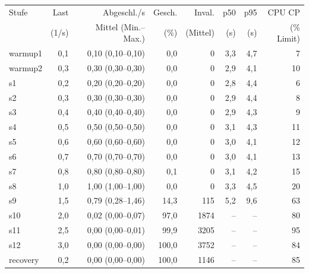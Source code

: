 \begin{tabular}{lrrrrrrr}
\toprule
Stufe & Last & Abgeschl./s & Gesch. & Inval. & p50 & p95 & CPU CP \\
 & (1/s) & Mittel (Min.–Max.) & (\%) & (Mittel) & (s) & (s) & (\% Limit) \\
\midrule
warmup1 & 0,1 & 0,10 (0,10–0,10) & 0,0 & 0 & 3,3 & 4,7 & 7 \\
warmup2 & 0,3 & 0,30 (0,30–0,30) & 0,0 & 0 & 2,9 & 4,1 & 10 \\
s1 & 0,2 & 0,20 (0,20–0,20) & 0,0 & 0 & 2,8 & 4,4 & 6 \\
s2 & 0,3 & 0,30 (0,30–0,30) & 0,0 & 0 & 2,9 & 4,4 & 8 \\
s3 & 0,4 & 0,40 (0,40–0,40) & 0,0 & 0 & 2,9 & 4,3 & 9 \\
s4 & 0,5 & 0,50 (0,50–0,50) & 0,0 & 0 & 3,1 & 4,3 & 11 \\
s5 & 0,6 & 0,60 (0,60–0,60) & 0,0 & 0 & 3,0 & 4,1 & 12 \\
s6 & 0,7 & 0,70 (0,70–0,70) & 0,0 & 0 & 3,0 & 4,1 & 13 \\
s7 & 0,8 & 0,80 (0,80–0,80) & 0,1 & 0 & 3,1 & 4,2 & 15 \\
s8 & 1,0 & 1,00 (1,00–1,00) & 0,0 & 0 & 3,3 & 4,5 & 20 \\
s9 & 1,5 & 0,79 (0,28–1,46) & 14,3 & 115 & 5,2 & 9,6 & 63 \\
s10 & 2,0 & 0,02 (0,00–0,07) & 97,0 & 1874 & – & – & 80 \\
s11 & 2,5 & 0,00 (0,00–0,01) & 99,9 & 3205 & – & – & 95 \\
s12 & 3,0 & 0,00 (0,00–0,00) & 100,0 & 3752 & – & – & 84 \\
recovery & 0,2 & 0,00 (0,00–0,00) & 100,0 & 1146 & – & – & 85 \\
\bottomrule
\end{tabular}
